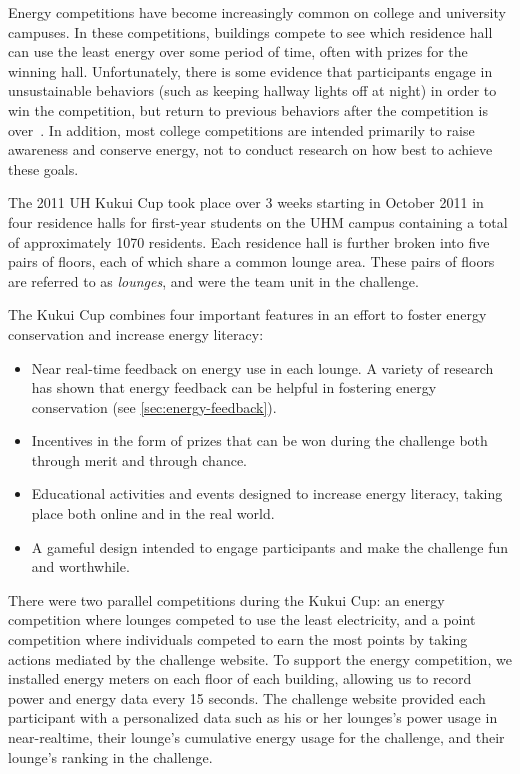 Energy competitions have become increasingly common on college and university campuses. In these competitions, buildings compete to see which residence hall can use the least energy over some period of time, often with prizes for the winning hall. Unfortunately, there is some evidence that participants engage in unsustainable behaviors (such as keeping hallway lights off at night) in order to win the competition, but return to previous behaviors after the competition is over~\cite{petersen-dorm-energy-reduction}. In addition, most college competitions are intended primarily to raise awareness and conserve energy, not to conduct research on how best to achieve these goals.

The 2011 UH Kukui Cup took place over 3 weeks starting in October 2011 in four residence halls for first-year students on the UHM campus containing a total of approximately 1070 residents. Each residence hall is further broken into five pairs of floors, each of which share a common lounge area. These pairs of floors are referred to as \emph{lounges}, and were the team unit in the challenge.

The Kukui Cup combines four important features in an effort to foster energy conservation and increase energy literacy:

\begin{itemize}
	\item Near real-time feedback on energy use in each lounge. A variety of research has shown that energy feedback can be helpful in fostering energy conservation (see \autoref{sec:energy-feedback}).
	\item Incentives in the form of prizes that can be won during the challenge both through merit and through chance.
	\item Educational activities and events designed to increase energy literacy, taking place both online and in the real world.
	\item A gameful design intended to engage participants and make the challenge fun and worthwhile.
\end{itemize}

There were two parallel competitions during the Kukui Cup: an energy competition where lounges competed to use the least electricity, and a point competition where individuals competed to earn the most points by taking actions mediated by the challenge website. To support the energy competition, we installed energy meters on each floor of each building, allowing us to record power and energy data every 15 seconds. The challenge website provided each participant with a personalized data such as his or her lounges's power usage in near-realtime, their lounge's cumulative energy usage for the challenge, and their lounge's ranking in the challenge.

